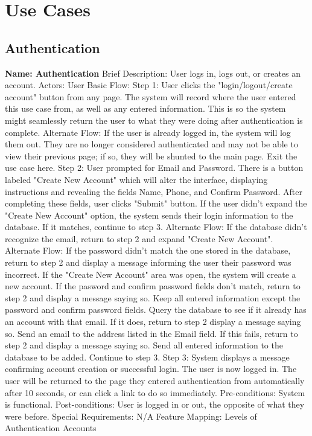 \section{Use Cases}

\subsection{Authentication}
\begin{outline}[enumerate]

\1 {\bf Name: Authentication}
\2 Brief Description: User logs in, logs out, or creates an account.
\2 Actors: User
\2 Basic Flow:
\3 Step 1: User clicks the "login/logout/create account" button from any page.
\4 The system will record where the user entered this use case from, as well as any entered information.  This is so the system might seamlessly return the user to what they were doing after authentication is complete.
\4 Alternate Flow: If the user is already logged in, the system will log them out.  They are no longer considered authenticated and may not be able to view their previous page; if so, they will be shunted to the main page.  Exit the use case here.
\3 Step 2: User prompted for Email and Password.  There is a button labeled "Create New Account" which will alter the interface, displaying instructions and revealing the fields Name, Phone, and Confirm Password.  After completing these fields, user clicks "Submit" button.
\4 If the user didn't expand the "Create New Account" option, the system sends their login information to the database.  If it matches, continue to step 3.
\4 Alternate Flow: If the database didn't recognize the email, return to step 2 and expand "Create New Account".
\4 Alternate Flow: If the password didn't match the one stored in the database, return to step 2 and display a message informing the user their password was incorrect.
\3 If the "Create New Account" area was open, the system will create a new account.
\4 If the pasword and confirm password fields don't match, return to step 2 and display a message saying so.  Keep all entered information except the password and confirm password fields.
\4 Query the database to see if it already has an account with that email.  If it does, return to step 2 display a message saying so.
\4 Send an email to the address listed in the Email field.  If this fails, return to step 2 and display a message saying so.
\4 Send all entered information to the database to be added.  Continue to step 3.
\3 Step 3: System displays a message confirming account creation or successful login.  The user is now logged in.  The user will be returned to the page they entered authentication from automatically after 10 seconds, or can click a link to do so immediately.
\2 Pre-conditions:
\3 System is functional.
\2 Post-conditions:
\3 User is logged in or out, the opposite of what they were before.
\2 Special Requirements:
\3 N/A
\2 Feature Mapping:
\3 Levels of Authentication
\3 Accounts

\end{outline}

